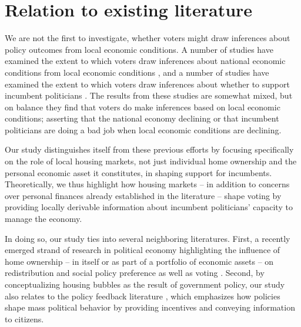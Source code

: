 \documentclass[12pt,a4paper]{article}
\begin{document}






\section{Relation to existing literature}

We are not the first to investigate, whether voters might draw inferences about policy outcomes from local economic conditions. A number of studies have examined the extent to which voters draw inferences about national economic conditions from local economic conditions \citep{books1999contextual,reeves2012ecologies,anderson2011local,ansolabehere2014mecro,bisgaard2016reconsidering}, and a number of studies have examined the extent to which voters draw inferences about whether to support incumbent politicians  \citep{hansford2015reevaluating,eisenberg2004economic,kim2003spatial,healy2014presidential}. The results from these studies are somewhat mixed, but on balance they find that voters do make inferences based on local economic conditions; asserting that the national economy declining or that incumbent politicians are doing a bad job when local economic conditions are declining. 

Our study distinguishes itself from these previous efforts by focusing specifically on the role of local housing markets, not just individual home ownership and the personal economic asset it constitutes, in shaping support for incumbents. Theoretically, we thus highlight how housing markets -- in addition to concerns over personal finances already established in the literature -- shape voting by providing locally derivable information about incumbent politicians’ capacity to manage the economy.

In doing so, our study ties into several neighboring literatures. First, a recently emerged strand of research in political economy highlighting the influence of home ownership -- in itself or as part of a portfolio of economic assets -- on redistribution and social policy preference as well as voting \citep{ansell2014political,nadeau2010patrimonial,stubager2013reaching}. Second, by conceptualizing housing bubbles as the result of government policy, our study also relates to the policy feedback literature \citep{campbell2012policy,mettler2004consequences,pierson1993effect}, which emphasizes how policies shape mass political behavior by providing incentives and conveying information to citizens.
\end{document}
